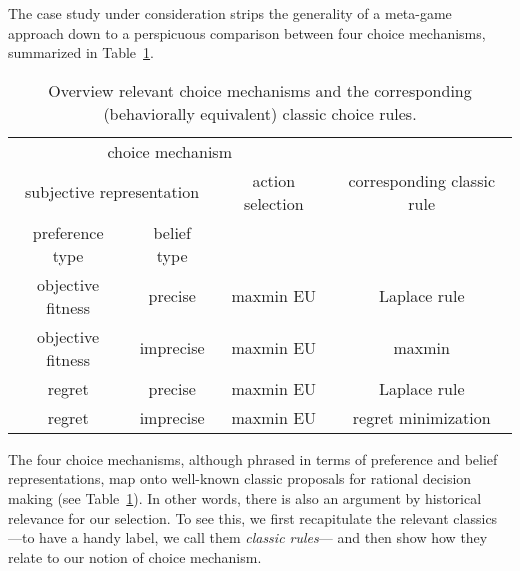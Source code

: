\documentclass[fleqn,reqno,11pt]{article}
\begin{document}
The case study under consideration strips the generality of a meta-game approach down to a perspicuous
comparison between four choice mechanisms, summarized in Table~\ref{tab:CMs}.
\begin{table}[t]
  \centering
  \begin{tabular}{cccc}
  \multicolumn{3}{c}{choice mechanism} \\  \cmidrule(r){1-3}
    \multicolumn{2}{c}{subjective representation} & action selection & corresponding classic rule \\  \cmidrule(r){1-2}
    preference type & belief type  \\ \midrule
    objective fitness & precise & maxmin EU &  Laplace rule \\
    objective fitness & imprecise & maxmin EU & maxmin \\ 
    regret & precise & maxmin EU & Laplace rule \\
    regret & imprecise & maxmin EU & regret minimization \\ 
  \end{tabular}
  \caption{Overview relevant choice mechanisms and the corresponding (behaviorally equivalent)
    classic choice rules.}
  \label{tab:CMs}
\end{table}
\iffalse
This exclusive selection of choice mechanisms is motivated by a number of
considerations. Firstly, the set of conceivable choice mechanisms is vast. Most of that
conceivable vastness is utter nonsense, and some selection of plausible candidates is required in
any case. Secondly, a restriction to only a small number of suitable candidates will
help demonstrate more distinctly how a meta game approach may help structure philosophical
inquiry, which is our main goal. Thirdly, our case study adds to the recent literature on the
evolution of preferences by making evident the possibly non-trivial interaction between
preference and belief representations, all else equal. This is our secondary goal. 
Finally,
\fi 
The
four choice mechanisms,  
although phrased in terms of preference and belief
representations, map onto well-known classic proposals for rational decision making (see
Table~\ref{tab:CMs}). In other words, there is also an argument by historical relevance for our
selection. To see this, we first recapitulate the relevant classics ---to have a handy label,
we call them \emph{classic rules}--- and then show how they relate to our notion of choice
mechanism.
\end{document}
